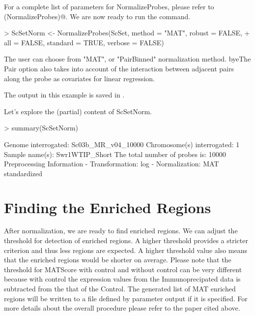 \documentclass[11pt]{article}
\begin{document}
For a complete list of parameters for NormalizeProbes, please refer to 
\newline
\verb@help(NormalizeProbes)@.	
	We are now ready to run the command.

\begin{Schunk}
\begin{Sinput}
> ScSetNorm <- NormalizeProbes(ScSet, method = "MAT", robust = FALSE, 
+     all = FALSE, standard = TRUE, verbose = FALSE)
\end{Sinput}
\end{Schunk}

The user can choose from "MAT", or "PairBinned" normalization method. byeThe Pair option also takes into account of the interaction between adjacent pairs along the probe as covariates for linear regression.

The output in this example is saved in \verb@ScSetNorm@. 

Let's explore the (partial) content of ScSetNorm.

\begin{Schunk}
\begin{Sinput}
> summary(ScSetNorm)
\end{Sinput}
\begin{Soutput}
   Genome interrogated:  Sc03b_MR_v04_10000  
   Chromosome(s) interrogated: 1 
   Sample name(s):  Swr1WTIP_Short  
   The total number of probes is:  10000  
   Preprocessing Information 
     - Transformation: log 
     - Normalization: MAT standardized 
\end{Soutput}
\end{Schunk}


\part{Finding the Enriched Regions}
After normalization, we are ready to find enriched regions.  We can adjust the threshold for detection of enriched regions. A higher threshold provides a stricter criterion and thus less regions are expected. A higher threshold value also means that the enriched regions would be shorter on average. Please note that the threshold for MATScore with control and without control can be very different because with control the expression values from the Immunoprecipated data is subtracted from the that of the Control. The generated list of MAT enriched regions will be written to a file defined by parameter output if it is specified. For more details about the overall procedure please refer to the paper cited above.
\end{document}
